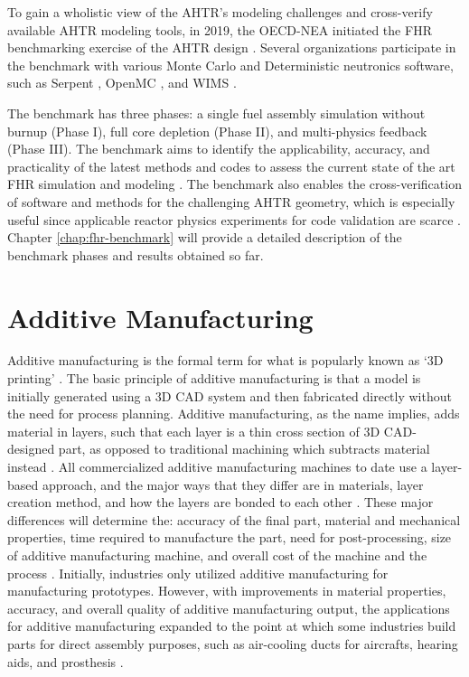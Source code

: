 To gain a wholistic view of the \gls{AHTR}'s modeling challenges and 
cross-verify available \gls{AHTR} modeling tools, in 2019, the 
\gls{OECD}-\gls{NEA} initiated the \gls{FHR} benchmarking exercise 
of the \gls{AHTR} design \cite{noauthor_fluoride_nodate}.
Several organizations participate in the benchmark with various Monte Carlo
and Deterministic neutronics software, such as Serpent \cite{leppanen_serpent_2014}, 
OpenMC \cite{romano_openmc_2013}, and WIMS \cite{lindley_current_2017}. 

The benchmark has three phases: a single fuel assembly simulation 
without burnup (Phase I), full core depletion (Phase II), and multi-physics 
feedback (Phase III). 
The benchmark aims to identify the applicability, accuracy, and practicality 
of the latest methods and codes to assess the current state 
of the art FHR simulation and modeling \cite{petrovic_preliminary_2021}. 
The benchmark also enables the cross-verification of software and methods 
for the challenging \gls{AHTR} geometry, which is especially useful since 
applicable reactor physics experiments for code validation are scarce 
\cite{petrovic_fhrahtr_2019,petrovic_preliminary_2021}. 
Chapter \ref{chap:fhr-benchmark} will provide a detailed description of the 
benchmark phases and results obtained so far.

\section{Additive Manufacturing}
Additive manufacturing is the formal term for what is popularly known as `3D printing' 
\cite{gibson_additive_2014}. 
The basic principle of additive manufacturing is that a model is initially generated using a
\gls{3D CAD} system and then fabricated directly without the need for process 
planning. 
Additive manufacturing, as the name implies, adds material in layers, such that 
each layer is a thin cross section of \gls{3D CAD}-designed part, as opposed 
to traditional machining which subtracts material instead 
\cite{standard_standard_2012}. 
All commercialized additive manufacturing machines to date use a layer-based approach, and 
the major ways that they differ are in materials, layer creation method, and 
how the layers are bonded to each other \cite{gibson_additive_2014}.
These major differences will determine the: accuracy of the 
final part, material and mechanical properties, time required to manufacture 
the part, need for post-processing, size of additive manufacturing machine, and overall 
cost of the machine and the process \cite{gibson_additive_2014}. 
Initially, industries only utilized additive manufacturing for manufacturing prototypes. 
However, with improvements in material properties, accuracy, and overall quality 
of additive manufacturing output, the applications for additive manufacturing expanded to the 
point at which some industries build parts for direct assembly purposes, such as
air-cooling ducts for aircrafts, hearing aids, and prosthesis
\cite{uriondo_present_2015}.  

